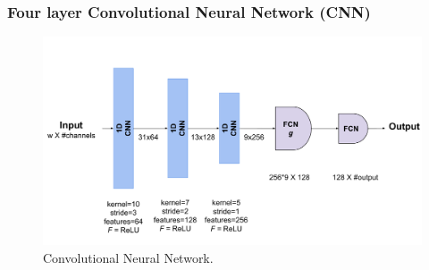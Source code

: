 \documentclass{beamer}
\begin{document}
\begin{frame}
\frametitle{Four layer Convolutional Neural Network (CNN)}

\begin{figure}[ht!]
    \centering
        \includegraphics[scale=0.36]{images/cnn.pdf}
    \caption{Convolutional Neural Network.}
    \label{fig:random}
    \vspace{-1em}
\end{figure}


\end{frame}
\end{document}
